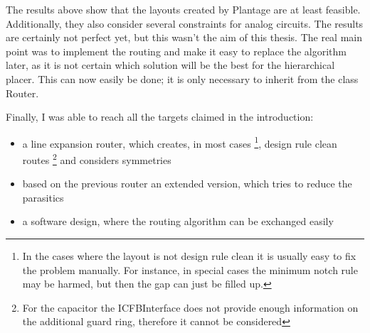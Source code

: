The results above show that the layouts created by Plantage are at least feasible. Additionally, they also consider several constraints for analog circuits. The results are certainly not perfect yet, but this wasn't the aim of this thesis. The real main point was to implement the routing and make it easy to replace the algorithm later, as it is not certain which solution will be the best for the hierarchical placer. This can now easily be done; it is only necessary to inherit from the class Router.

\begin{samepage}
Finally, I was able to reach all the targets claimed in the introduction:
\begin{itemize}
\item a line expansion router, which creates, in most cases \footnote{In the cases where the layout is not design rule clean it is usually easy to fix the problem manually. For instance, in special cases the minimum notch rule may be harmed, but then the gap can just be filled up.}, design rule clean routes \footnote{For the capacitor the ICFBInterface does not provide enough information on the additional guard ring, therefore it cannot be considered} and considers symmetries
\item based on the previous router an extended version, which tries to reduce the parasitics
\item a software design, where the routing algorithm can be exchanged easily
\end{itemize}
\end{samepage}

